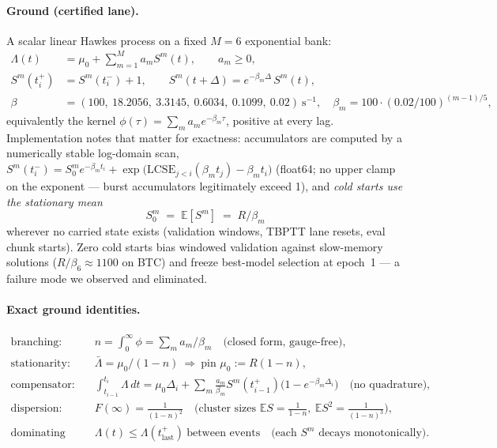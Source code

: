 \documentclass[11pt]{article}
\newcommand{\Fano}{F}
\begin{document}
\paragraph{Ground (certified lane).} A scalar linear Hawkes process on a fixed
$M{=}6$ exponential bank:
\begin{align}
\Lambda(t)&=\mu_0+\sum_{m=1}^{M} a_m S^m(t), \qquad a_m\ge 0,\\
S^m(t_i^+)&=S^m(t_i^-)+1, \qquad
S^m(t+\Delta)=e^{-\beta_m\Delta}\,S^m(t),\\
\beta &= (100,\ 18.2056,\ 3.3145,\ 0.6034,\ 0.1099,\ 0.02)\ \mathrm{s}^{-1},
\quad \beta_m = 100\cdot(0.02/100)^{(m-1)/5},
\end{align}
equivalently the kernel $\phi(\tau)=\sum_m a_m e^{-\beta_m\tau}$, positive at
every lag. Implementation notes that matter for exactness: accumulators are
computed by a numerically stable log-domain scan,
$S^m(t_i^-)=S^m_0 e^{-\beta_m t_i}+\exp\!\big(\mathrm{LCSE}_{j<i}(\beta_m t_j)-\beta_m t_i\big)$
(float64; no upper clamp on the exponent --- burst accumulators legitimately
exceed 1), and \emph{cold starts use the stationary mean}
\begin{equation}
S^m_0 \;=\; \mathbb{E}[S^m] \;=\; R/\beta_m
\label{eq:coldstart}
\end{equation}
wherever no carried state exists (validation windows, TBPTT lane resets, eval
chunk starts). Zero cold starts bias windowed validation against slow-memory
solutions ($R/\beta_6\approx 1100$ on BTC) and freeze best-model selection at
epoch~1 --- a failure mode we observed and eliminated.

\paragraph{Exact ground identities.}
\begin{align}
\text{branching:}\quad & n=\int_0^\infty\!\phi=\sum_m a_m/\beta_m
\quad\text{(closed form, gauge-free)},\\
\text{stationarity:}\quad & \bar\Lambda=\mu_0/(1-n)
\ \Rightarrow\ \text{pin } \mu_0:=R(1-n),\\
\text{compensator:}\quad &
\int_{t_{i-1}}^{t_i}\!\Lambda\,dt=\mu_0\Delta_i+\sum_m\tfrac{a_m}{\beta_m}
S^m(t_{i-1}^+)\big(1-e^{-\beta_m\Delta_i}\big)
\quad\text{(no quadrature)},\\
\text{dispersion:}\quad & \Fano(\infty)=\frac{1}{(1-n)^2}
\quad\text{(cluster sizes } \mathbb{E}S=\tfrac{1}{1-n},\ \mathbb{E}S^2=\tfrac{1}{(1-n)^3}),\\
\text{dominating rate:}\quad & \Lambda(t)\le\Lambda(t_{\mathrm{last}}^+)\ \text{between events}
\quad\text{(each } S^m \text{ decays monotonically)}.
\end{align}
\end{document}
